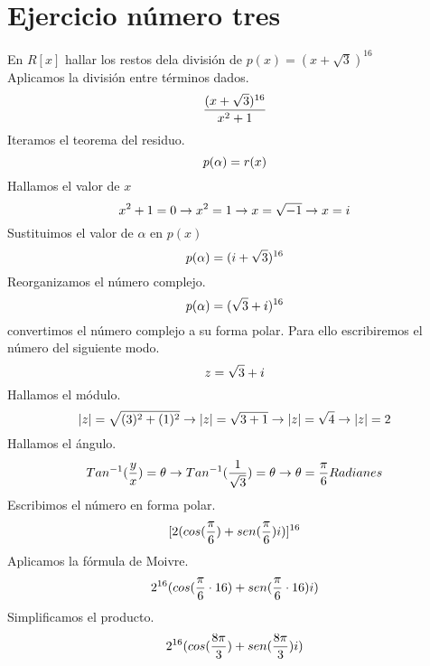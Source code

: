 \documentclass[letterpaper, 10pt]{article}
\begin{document}
    \section{Ejercicio número tres}
    En $R[x]$ hallar los restos dela división de $p(x)=(x+\sqrt{3})^{16}$ \\
    Aplicamos la división entre términos dados.
    \begin{equation} \notag \frac{(x+\sqrt{3})^{16}}{x^2+1} \end{equation}
    Iteramos el teorema del residuo.
    \begin{equation} \notag p(\alpha)=r(x) \end{equation}
    Hallamos el valor de $x$
    \begin{equation} \notag x^2+1=0 \rightarrow x^2=1 \rightarrow x=\sqrt{-1} \rightarrow x=i \end{equation}    
    Sustituimos el valor de $\alpha$ en $p(x)$
    \begin{equation} \notag p(\alpha)=(i+\sqrt{3})^{16} \end{equation}
    Reorganizamos el número complejo.
    \begin{equation} \notag p(\alpha)=(\sqrt{3}+i)^{16} \end{equation}
    convertimos el número complejo a su forma polar. Para ello escribiremos el número del siguiente modo.
    \begin{equation} \notag z=\sqrt{3}+i \end{equation}
    Hallamos el módulo.
    \begin{equation} \notag |z|=\sqrt{(3)^2+(1)^2} \rightarrow |z|=\sqrt{3+1} \rightarrow |z|=\sqrt{4} \rightarrow |z|=2 \end{equation}
    Hallamos el ángulo.
    \begin{equation} \notag Tan^{-1}(\frac{y}{x})=\theta \rightarrow Tan^{-1}(\frac{1}{\sqrt{3}})=\theta \rightarrow \theta=\frac{\pi}{6}Radianes \end{equation}
    Escribimos el número en forma polar.
    \begin{equation} \notag [2(cos(\frac{\pi}{6})+sen(\frac{\pi}{6})i)]^{16} \end{equation}
    Aplicamos la fórmula de Moivre.
    \begin{equation} \notag 2^{16}(cos(\frac{\pi}{6}\cdot 16)+sen(\frac{\pi}{6}\cdot 16)i) \end{equation}
    Simplificamos el producto.
    \begin{equation} \notag 2^{16}(cos(\frac{8\pi}{3})+sen(\frac{8\pi}{3})i) \end{equation}
\end{document}

